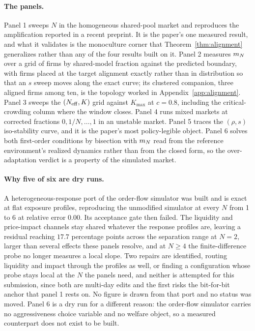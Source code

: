 \paragraph{The panels.} Panel 1 sweeps $N$ in the homogeneous shared-pool market and reproduces the amplification reported in a recent preprint. It is the paper's one measured result, and what it validates is the monoculture corner that Theorem~\ref{thm:alignment} generalizes rather than any of the four results built on it. Panel 2 measures $m_N$ over a grid of firms by shared-model fraction against the predicted boundary, with firms placed at the target alignment exactly rather than in distribution so that an $s$ sweep moves along the exact curve; its clustered companion, three aligned firms among ten, is the topology worked in Appendix~\ref{app:alignment}. Panel 3 sweeps the $(N_{\mathrm{eff}}, K)$ grid against $K_{\max}$ at $c = 0.8$, including the critical-crowding column where the window closes. Panel 4 runs mixed markets at corrected fractions $0, 1/N, \ldots, 1$ in an unstable market. Panel 5 traces the $(\rho, s)$ iso-stability curve, and it is the paper's most policy-legible object. Panel 6 solves both first-order conditions by bisection with $m_N$ read from the reference environment's realized dynamics rather than from the closed form, so the over-adaptation verdict is a property of the simulated market.

\paragraph{Why five of six are dry runs.} A heterogeneous-response port of the order-flow simulator was built and is exact at flat exposure profiles, reproducing the unmodified simulator at every $N$ from 1 to 6 at relative error $0.00$. Its acceptance gate then failed. The liquidity and price-impact channels stay shared whatever the response profiles are, leaving a residual reaching $17.7$ percentage points across the separation range at $N=2$, larger than several effects these panels resolve, and at $N \geq 4$ the finite-difference probe no longer measures a local slope. Two repairs are identified, routing liquidity and impact through the profiles as well, or finding a configuration whose probe stays local at the $N$ the panels need, and neither is attempted for this submission, since both are multi-day edits and the first risks the bit-for-bit anchor that panel 1 rests on. No figure is drawn from that port and no status was moved. Panel 6 is a dry run for a different reason: the order-flow simulator carries no aggressiveness choice variable and no welfare object, so a measured counterpart does not exist to be built.

